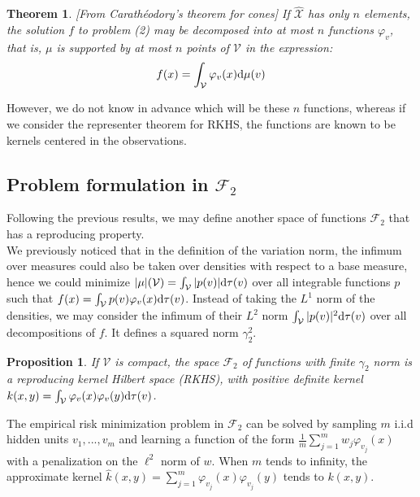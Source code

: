 \documentclass[a4paper, 11pt]{scrartcl}
\newtheorem{theorem}{Theorem}[section]
\newtheorem{proposition}{Proposition}[section]
\begin{document}
{\begin{theorem}{\emph{[From Carathéodory's theorem for cones]}} If $\mathcal{\hat X}$ has only $n$ elements, the solution $f$ to problem (2) may be decomposed into at most $n$ functions $\varphi_v$, that is, $\mu$ is supported by at most $n$ points of $\mathcal{V}$ in the expression: $$ f(x) = \int_\mathcal{V} \varphi_v(x) \textnormal{d}\mu(v) $$
\end{theorem}

However, we do not know in advance which will be these $n$ functions, whereas if we consider the representer theorem for RKHS, the functions are known to be kernels centered in the observations.


\subsection{Problem formulation in $\mathcal{F}_2$}

Following the previous results, we may define another space of functions $\mathcal{F}_2$ that has a reproducing property. \\

We previously noticed that in the definition of the variation norm, the infimum over measures could also be taken over densities with respect to a base measure, hence we could minimize $|\mu|(\mathcal{V}) = \int_\mathcal{V} |p(v)| \textnormal{d}\tau(v)$ over all integrable functions $p$ such that $f(x) = \int_\mathcal{V} p(v) \varphi_v(x)\textnormal{d}\tau(v)$. Instead of taking the $L^1$ norm of the densities, we may consider the infimum of their $L^2$ norm $\int_\mathcal{V} |p(v)|^2 \textnormal{d}\tau(v)$ over all decompositions of $f$. It defines a squared norm $\gamma_2^2$.


\begin{proposition}
If $\mathcal{V}$ is compact, the space $\mathcal{F}_2$ of functions with finite $\gamma_2$ norm is a reproducing kernel Hilbert space (RKHS), with positive definite kernel $k(x,y)=\int_\mathcal{V} \varphi_v(x) \varphi_v(y) \textnormal{d}\tau(v)$.
\end{proposition}

The empirical risk minimization problem in $\mathcal{F}_2$ can be solved by sampling $m$ i.i.d hidden units $v_1,...,v_m$ and learning a function of the form $\frac{1}{m} \sum_{j=1}^m w_j \varphi_{v_j}(x)$ with a penalization on the $\ell^2$ norm of $w$. When $m$ tends to infinity, the approximate kernel $\hat k(x,y) = \sum_{j=1}^m \varphi_{v_j}(x) \varphi_{v_j}(y)$ tends to $k(x,y)$.

}
\end{document}
